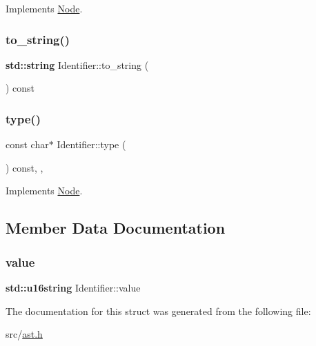 Implements \hyperlink{struct_node_a10bd7af968140bbf5fa461298a969c71}{Node}.

\mbox{\label{struct_identifier_a86c253d449b695548284efd85ec2be4e}} 
\subsubsection{\texorpdfstring{to\+\_\+string()}{to\_string()}}
{\footnotesize\ttfamily \textbf{ std\+::string} Identifier\+::to\+\_\+string (\begin{DoxyParamCaption}{ }\end{DoxyParamCaption}) const\hspace{0.3cm}{\ttfamily [inline]}}

\mbox{\label{struct_identifier_a8b4c74fe6ce48b6e13ae25dff7c60842}} 
\subsubsection{\texorpdfstring{type()}{type()}}
{\footnotesize\ttfamily const char$\ast$ Identifier\+::type (\begin{DoxyParamCaption}{ }\end{DoxyParamCaption}) const\hspace{0.3cm}{\ttfamily [inline]}, {\ttfamily [override]}, {\ttfamily [virtual]}}



Implements \hyperlink{struct_node_a82f29420d0a38efcc370352528e94e9b}{Node}.



\subsection{Member Data Documentation}
\mbox{\label{struct_identifier_a1deb747305d88d9ccac5137a65838d63}} 
\subsubsection{\texorpdfstring{value}{value}}
{\footnotesize\ttfamily \textbf{ std\+::u16string} Identifier\+::value}



The documentation for this struct was generated from the following file\+:\begin{DoxyCompactItemize}
\item 
src/\hyperlink{ast_8h}{ast.\+h}\end{DoxyCompactItemize}

